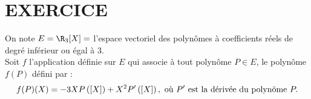 \documentclass[11pt]{article}%
\begin{document}
\indent \vspace{0.2cm}


\vspace{0.5cm}

\section*{EXERCICE}

\noindent On note $E = \R_{3} [X] = $ l'espace vectoriel des polynômes
à coefficients réels de degré inférieur ou égal à 3. \\
Soit $f$ l'application définie sur $E$ qui associe à tout polynôme $P
\in E$, le polynôme $f(P)$ défini par : 
\[
 f(P) (X) = - 3 X P\left(\left[ {X} \right]\right) + X^{2} P'\left(\left[ {X} \right]\right),
\text{ où } P' \text{ est la dérivée du polynôme } P. 
\]
\end{document}

